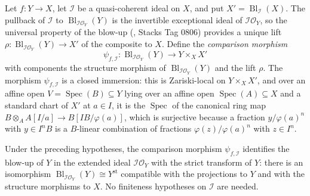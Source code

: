 \begin{definition}
  \label{def:nagata-strict-transform-blowup-comparison}
  \leanok

  Let $f\colon Y\to X$, let $\mathcal I$ be a quasi-coherent ideal on $X$,
  and put $X'=\operatorname{Bl}_{\mathcal I}(X)$.  The pullback of
  $\mathcal I$ to $\operatorname{Bl}_{\mathcal I\mathcal O_Y}(Y)$ is the
  invertible exceptional ideal of $\mathcal I\mathcal O_Y$, so the universal
  property of the blow-up (,
  Stacks Tag 0806) provides a unique lift
  $\rho\colon\operatorname{Bl}_{\mathcal I\mathcal O_Y}(Y)\to X'$ of the
  composite to $X$.  Define the \emph{comparison morphism}
  \[
    \psi_{f,\mathcal I}\colon
      \operatorname{Bl}_{\mathcal I\mathcal O_Y}(Y)\longrightarrow
      Y\times_XX'
  \]
  with components the structure morphism of
  $\operatorname{Bl}_{\mathcal I\mathcal O_Y}(Y)$ and the lift $\rho$.
  The morphism $\psi_{f,\mathcal I}$ is a closed immersion: this is
  Zariski-local on $Y\times_XX'$, and over an affine open
  $V=\operatorname{Spec}(B)\subseteq Y$ lying over an affine open
  $\operatorname{Spec}(A)\subseteq X$ and a standard chart of $X'$ at
  $a\in I$, it is the $\operatorname{Spec}$ of the canonical ring map
  $B\otimes_AA[I/a]\to B[IB/\varphi(a)]$, which is surjective because a
  fraction $y/\varphi(a)^n$ with $y\in I^nB$ is a $B$-linear combination of
  fractions $\varphi(z)/\varphi(a)^n$ with $z\in I^n$.
\end{definition}

\begin{theorem}
  \label{thm:nagata-strict-transform-is-blowup}
  \leanok

  Under the preceding hypotheses, the comparison morphism
  $\psi_{f,\mathcal I}$ identifies the blow-up of $Y$ in the extended ideal
  $\mathcal I\mathcal O_Y$ with the strict transform of $Y$: there is an
  isomorphism
  $\operatorname{Bl}_{\mathcal I\mathcal O_Y}(Y)\cong Y^{\mathrm{st}}$
  compatible with the projections to $Y$ and with the structure morphisms
  to $X$.  No finiteness hypotheses on $\mathcal I$ are needed.
\end{theorem}

